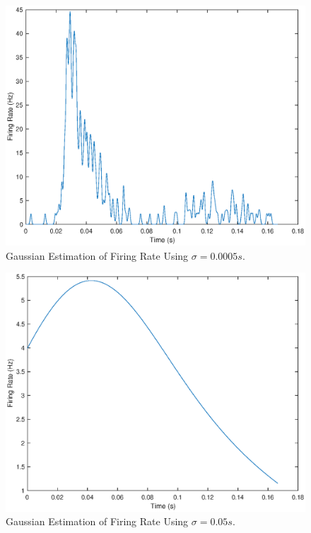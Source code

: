 \documentclass[11pt, oneside]{article}
\begin{document}
\begin{figure}[ht!]
\includegraphics[width=1\textwidth]{halfmillisecondplot.eps}
\caption{Gaussian Estimation of Firing Rate Using $\sigma = 0.0005s$.}
\label{fig:point5ms}
\end{figure}


\begin{figure}[ht!]
\includegraphics[width=1\textwidth]{fiftymillisecondplot.eps}
\caption{Gaussian Estimation of Firing Rate Using $\sigma = 0.05s$.}
\label{fig:50ms}
\end{figure}
\end{document}
